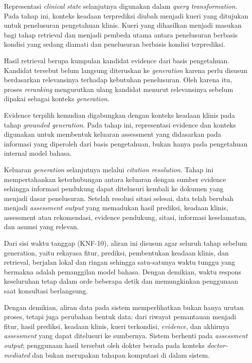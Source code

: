 Representasi \textit{clinical state} selanjutnya digunakan dalam \textit{query transformation}. Pada tahap ini, konteks keadaan terprediksi diubah menjadi kueri yang ditujukan untuk
penelusuran pengetahuan klinis. Kueri yang dihasilkan menjadi masukan bagi tahap retrieval dan menjadi pembeda utama antara penelusuran berbasis kondisi yang sedang diamati
dan penelusuran berbasis kondisi terprediksi.

Hasil retrieval berupa kumpulan kandidat evidence dari basis pengetahuan. Kandidat tersebut belum langsung diteruskan ke \textit{generation} karena perlu disusun berdasarkan relevansinya
terhadap kebutuhan penelusuran. Oleh karena itu, proses \textit{reranking} mengurutkan ulang kandidat menurut relevansinya sebelum dipakai sebagai konteks \textit{generation}.

Evidence terpilih kemudian digabungkan dengan konteks keadaan klinis pada tahap \textit{grounded generation}. Pada tahap ini, representasi evidence dan konteks digunakan untuk membentuk
keluaran assessment yang didasarkan pada informasi yang diperoleh dari basis pengetahuan, bukan hanya pada pengetahuan internal model bahasa.

Keluaran \textit{generation} selanjutnya melalui \textit{citation resolution}. Tahap ini mempertahankan keterhubungan antara keluaran dengan sumber evidence sehingga informasi pendukung
dapat ditelusuri kembali ke dokumen yang menjadi dasar penelusuran. Setelah resolusi sitasi selesai, data telah berubah menjadi \textit{assessment output} yang memadukan hasil prediksi,
keadaan klinis, assessment atau rekomendasi, evidence pendukung, sitasi, informasi keselamatan, dan asumsi yang relevan.

Dari sisi waktu tanggap (KNF-10), aliran ini disusun agar seluruh tahap sebelum generation, yaitu rekayasa fitur, prediksi, pembentukan keadaan klinis, dan
retrieval, berjalan lokal dan ringan sehingga satu-satunya waktu tunggu yang bermakna adalah pemanggilan model bahasa. Dengan demikian, waktu respons keseluruhan
tetap dalam orde beberapa detik dan memungkinkan penggunaan saat konsultasi berlangsung.

Dengan demikian, aliran data pada sistem memperlihatkan bukan hanya urutan proses, tetapi juga perubahan bentuk data: dari riwayat pemantauan menjadi fitur, hasil
prediksi, keadaan klinis, kueri terkondisi, \textit{evidence}, dan akhirnya \textit{assessment} yang dapat ditelusuri ke sumbernya. Sistem berhenti pada \textit{assessment output}; penggunaan hasil
tersebut oleh dokter berada pada konteks \textit{doctor-mediated} dan bukan merupakan tahapan komputasi di dalam sistem.

